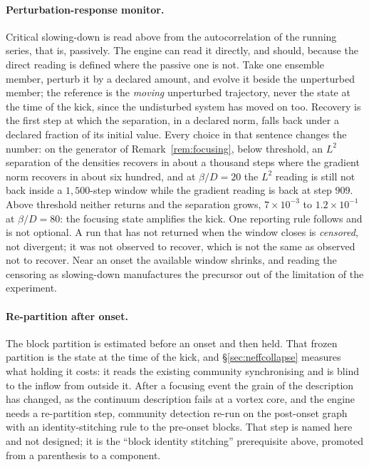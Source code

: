 \documentclass[11pt]{article}
\begin{document}
\paragraph{Perturbation-response monitor.} Critical slowing-down is read above from the autocorrelation of the running series, that is, passively. The engine can read it directly, and should, because the direct reading is defined where the passive one is not. Take one ensemble member, perturb it by a declared amount, and evolve it beside the unperturbed member; the reference is the \emph{moving} unperturbed trajectory, never the state at the time of the kick, since the undisturbed system has moved on too. Recovery is the first step at which the separation, in a declared norm, falls back under a declared fraction of its initial value. Every choice in that sentence changes the number: on the generator of Remark~\ref{rem:focusing}, below threshold, an $L^2$ separation of the densities recovers in about a thousand steps where the gradient norm recovers in about six hundred, and at $\beta/D = 20$ the $L^2$ reading is still not back inside a $1{,}500$-step window while the gradient reading is back at step $909$. Above threshold neither returns and the separation grows, $7\times10^{-3}$ to $1.2\times10^{-1}$ at $\beta/D=80$: the focusing state amplifies the kick. One reporting rule follows and is not optional. A run that has not returned when the window closes is \emph{censored}, not divergent; it was not observed to recover, which is not the same as observed not to recover. Near an onset the available window shrinks, and reading the censoring as slowing-down manufactures the precursor out of the limitation of the experiment.

\paragraph{Re-partition after onset.} The block partition is estimated before an onset and then held. That frozen partition is the state at the time of the kick, and \S\ref{sec:neffcollapse} measures what holding it costs: it reads the existing community synchronising and is blind to the inflow from outside it. After a focusing event the grain of the description has changed, as the continuum description fails at a vortex core, and the engine needs a re-partition step, community detection re-run on the post-onset graph with an identity-stitching rule to the pre-onset blocks. That step is named here and not designed; it is the ``block identity stitching'' prerequisite above, promoted from a parenthesis to a component.
\end{document}
